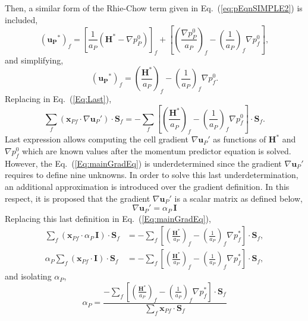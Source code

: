 \documentclass[final,3p,times,11pt,onecolumn]{myElsarticle}
\numberwithin{equation}{section}
\begin{document}
Then, a similar form of the Rhie-Chow term given in Eq.~(\ref{eq:pEqnSIMPLE2}) is included,
\begin{equation}
\left(
\boldsymbol{u_P}^{*}
\right)_{f}
=
\left[\frac{1}{a_P}\left(\boldsymbol{H}^* - \nabla p_P^{0}\right)\right]_f
+
\left[
\left(
\frac{\nabla p_P^{0}}{a_P}
\right)_f
- 
\left(
\frac{1}{a_P}
\right)_f 
\nabla p_f^{0} 
\right],
\end{equation}
and simplifying, 
\begin{equation}
\left(
\boldsymbol{u_P}^{*}
\right)_{f}
=
 \left(\frac{\boldsymbol{H}^*}{a_P}\right)_f 
 -
 \left(\frac{1}{a_P}\right)_f \nabla p_f^{0}.
\end{equation}
Replacing in Eq.~(\ref{Eq:Last}),
\begin{equation}
\label{Eq:mainGradEq}
\sum_f 
\left(
\boldsymbol{x}_{Pf}
\cdot 
\nabla \boldsymbol{u}_P'
\right)
\cdot 
\boldsymbol{S}_f
=
-\sum_f
\left[
\left(\frac{\boldsymbol{H}^*}{a_P}\right)_f 
 -
 \left(\frac{1}{a_P}\right)_f \nabla p_f^{0}
 \right]
\cdot 
\boldsymbol{S}_f.
\end{equation}
Last expression allows computing the cell gradient $\nabla \boldsymbol{u}_P'$ as functions of $\boldsymbol{H}^*$ and $\nabla p_f^{0}$ which are known values after the momentum predictor equation is solved. However, the Eq.~(\ref{Eq:mainGradEq}) is underdetermined since the gradient $\nabla \boldsymbol{u}_P'$ requires to define nine unknowns. In order to solve this last underdetermination, an additional approximation is introduced over the gradient definition. In this respect, it is proposed that the gradient $\nabla \boldsymbol{u}_P'$ is a scalar matrix as defined below,
\begin{equation}
\nabla \boldsymbol{u}_P'
=
\alpha_P\,
\boldsymbol{I}
\label{eq:gradApprox}
\end{equation}
Replacing this last definition in Eq.~(\ref{Eq:mainGradEq}),
\begin{align}
\sum_f 
\left(
\boldsymbol{x}_{Pf}
\cdot 
\alpha_P\,
\boldsymbol{I}
\right)
\cdot 
\boldsymbol{S}_f
&=
-\sum_f
\left[
\left(\frac{\boldsymbol{H}^*}{a_P}\right)_f 
 -
 \left(\frac{1}{a_P}\right)_f \nabla p_f^{*}
 \right]
\cdot 
\boldsymbol{S}_f,
\\
\alpha_P
\sum_f 
\left(
\boldsymbol{x}_{Pf}
\cdot 
\boldsymbol{I}
\right)
\cdot 
\boldsymbol{S}_f
&=
-\sum_f
\left[
\left(\frac{\boldsymbol{H}^*}{a_P}\right)_f 
 -
 \left(\frac{1}{a_P}\right)_f \nabla p_f^{*}
 \right]
\cdot 
\boldsymbol{S}_f,
\end{align}
and isolating $\alpha_P$,
\begin{equation}
\alpha_P
=
\dfrac
{-\sum_f
\left[
\left(\frac{\boldsymbol{H}^*}{a_P}\right)_f 
 -
 \left(\frac{1}{a_P}\right)_f \nabla p_f^{*}
 \right]
\cdot 
\boldsymbol{S}_f}
{\sum_f 
\boldsymbol{x}_{Pf}
\cdot 
\boldsymbol{S}_f}
\end{equation}
\end{document}
